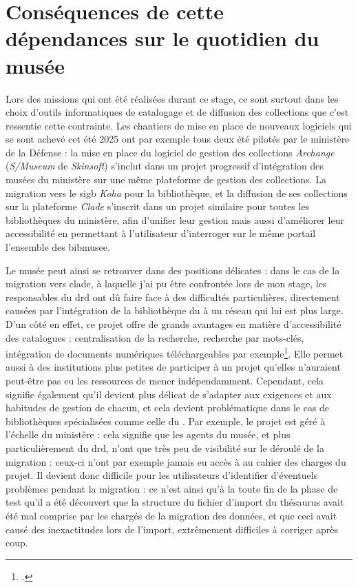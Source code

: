 \section{\label{I-B-2}Conséquences de cette dépendances sur le quotidien du musée}



Lors des missions qui ont été réalisées durant ce stage, ce sont surtout dans les choix d'outils informatiques de catalogage et de diffusion des collections que c'est ressentie cette contrainte. Les chantiers de mise en place de nouveaux logiciels qui se sont achevé cet été 2025 ont par exemple tous deux été pilotés par le ministère de la Défense : la mise en place du logiciel de gestion des collections \textit{Archange} (\textit{S/Museum} de \textit{Skinsoft}) s'inclut dans un projet progressif d'intégration des musées du ministère sur une même plateforme de gestion des collections. La migration vers le \ac{sigb} \textit{Koha} pour la bibliothèque, et la diffusion de ses collections sur la plateforme \textit{Clade} s'inscrit dans un projet similaire pour toutes les bibliothèques du ministère, afin d'unifier leur gestion mais aussi d'améliorer leur accessibilité en permettant à l'utilisateur d'interroger sur le même portail l'ensemble des \gls{bibmusee}.


Le musée peut ainsi se retrouver dans des positions délicates : dans le cas de la migration vers \gls{clade}, à laquelle j'ai pu être confrontée lors de mon stage, les responsables du \ac{drd} ont dû faire face à des difficultés particulières, directement causées par l'intégration de la bibliothèque du \mae à un réseau qui lui est plus large. D'un côté en effet, ce projet offre de grands avantages en matière d'accessibilité des catalogues : centralisation de la recherche, recherche par mots-clés, intégration de documents numériques téléchargeables par exemple\footcite{ministeredesarmeesKitCommunicationCLADE}. Elle permet aussi à des institutions plus petites de participer à un projet qu'elles n'auraient peut-être pas eu les ressources de mener indépendamment. Cependant, cela signifie également qu'il devient plus délicat de s'adapter aux exigences et aux habitudes de gestion de chacun, et cela devient problématique dans le cas de bibliothèques spécialisées comme celle du \mae. Par exemple, le projet est géré à l'échelle du ministère : cela signifie que les agents du musée, et plus particulièrement du \ac{drd}, n'ont que très peu de visibilité sur le déroulé de la migration : ceux-ci n'ont par exemple jamais eu accès à au cahier des charges du projet. Il devient donc difficile pour les utilisateurs d'identifier d'éventuels problèmes pendant la migration : ce n'est ainsi qu'à la toute fin de la phase de test qu'il a été découvert que la structure du fichier d'import du thésaurus avait été mal comprise par les chargés de la migration des données, et que ceci avait causé des inexactitudes lors de l'import, extrêmement difficiles à corriger après coup.